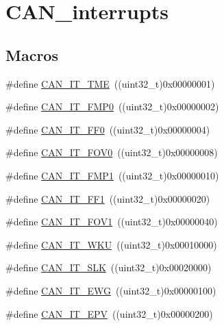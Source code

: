 \hypertarget{group___c_a_n__interrupts}{\section{C\-A\-N\-\_\-interrupts}
\label{group___c_a_n__interrupts}
}
\subsection*{Macros}
\begin{DoxyCompactItemize}
\item 
\#define \hyperlink{group___c_a_n__interrupts_ga619e36230fa2eb089a7c1936b5004eb9}{C\-A\-N\-\_\-\-I\-T\-\_\-\-T\-M\-E}~((uint32\-\_\-t)0x00000001)
\item 
\#define \hyperlink{group___c_a_n__interrupts_ga3fe6fbf53e9d692957e87ad329bcd362}{C\-A\-N\-\_\-\-I\-T\-\_\-\-F\-M\-P0}~((uint32\-\_\-t)0x00000002)
\item 
\#define \hyperlink{group___c_a_n__interrupts_gabf63043d9216de80ddc7ffe57b23ef67}{C\-A\-N\-\_\-\-I\-T\-\_\-\-F\-F0}~((uint32\-\_\-t)0x00000004)
\item 
\#define \hyperlink{group___c_a_n__interrupts_ga066a4317f95669e5b5931c9a759cf248}{C\-A\-N\-\_\-\-I\-T\-\_\-\-F\-O\-V0}~((uint32\-\_\-t)0x00000008)
\item 
\#define \hyperlink{group___c_a_n__interrupts_gaa0e101053fb203629e0e9a954213e71e}{C\-A\-N\-\_\-\-I\-T\-\_\-\-F\-M\-P1}~((uint32\-\_\-t)0x00000010)
\item 
\#define \hyperlink{group___c_a_n__interrupts_ga93b86d884ce0624b4b36c991fd75fc1c}{C\-A\-N\-\_\-\-I\-T\-\_\-\-F\-F1}~((uint32\-\_\-t)0x00000020)
\item 
\#define \hyperlink{group___c_a_n__interrupts_ga963301fdbede5f9a9665dc5b6210eaec}{C\-A\-N\-\_\-\-I\-T\-\_\-\-F\-O\-V1}~((uint32\-\_\-t)0x00000040)
\item 
\#define \hyperlink{group___c_a_n__interrupts_gac9c8767770d94de753dda9ad31f9af15}{C\-A\-N\-\_\-\-I\-T\-\_\-\-W\-K\-U}~((uint32\-\_\-t)0x00010000)
\item 
\#define \hyperlink{group___c_a_n__interrupts_ga639d4ab2777d9a2f8b7e67071b091059}{C\-A\-N\-\_\-\-I\-T\-\_\-\-S\-L\-K}~((uint32\-\_\-t)0x00020000)
\item 
\#define \hyperlink{group___c_a_n__interrupts_ga8a9f04ddf6ebe169d32b951a8ea135b3}{C\-A\-N\-\_\-\-I\-T\-\_\-\-E\-W\-G}~((uint32\-\_\-t)0x00000100)
\item 
\#define \hyperlink{group___c_a_n__interrupts_ga006b7b641d337a599ceac64b483e75dd}{C\-A\-N\-\_\-\-I\-T\-\_\-\-E\-P\-V}~((uint32\-\_\-t)0x00000200)

\end{DoxyCompactItemize}
